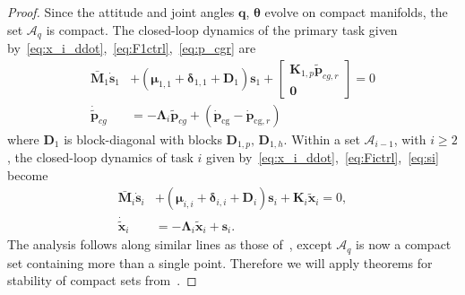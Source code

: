 \documentclass[../main.tex]{subfiles}
\begin{document}
\vspace{-7pt}
\begin{proof}
Since the attitude and joint angles $\bm{q}$, $\bm{\theta}$ evolve on compact manifolds, the set $\mathcal{A}_q$ is compact. The closed-loop dynamics of the primary task given by~\eqref{eq:x_i_ddot},~\eqref{eq:F1ctrl},~\eqref{eq:p_cgr} are
\vspace{-5pt}
\begin{subequations}\label{eq:y1_dyn}
    \begin{align}
        \bar{\bm{M}}_1 \dot{\bm{s}}_1 &+ \left( \bm{\mu}_{1,1} + \bm{\delta}_{1,1} + \bm{D}_1 \right) \bm{s}_1 + \left[ \begin{smallmatrix}
            \bm{K}_{1,p} \tilde{\bm{p}}_{cg,r} \\ \bm{0}
        \end{smallmatrix}\right] = 0\\
        \dot{\tilde{\bm{p}}}_{cg} &= - \bm{\Lambda}_i \tilde{\bm{p}}_{cg} + \left( \dot{\bm{p}}_{\textrm{cg}} - \dot{\bm{p}}_{\textrm{cg},r} \right)
    \end{align}
\end{subequations}
where $\bm{D}_1$ is block-diagonal with blocks $\bm{D}_{1,p},\, \bm{D}_{1,h}$. Within a set $\mathcal{A}_{i-1}$, with $i \geq 2$, the closed-loop dynamics of task $i$ given by~\eqref{eq:x_i_ddot},~\eqref{eq:Fictrl},~\eqref{eq:si} become
\begin{subequations}\label{eq:yi_dyn}
    \begin{align}
        \bar{\bm{M}}_i \dot{\bm{s}}_i &+ \left( \bm{\mu}_{i,i} + \bm{\delta}_{i,i} + \bm{D}_i \right) \bm{s}_i + \bm{K}_i \tilde{\bm{x}}_i = 0,\\
        \dot{\tilde{\bm{x}}}_i &= - \bm{\Lambda}_i \tilde{\bm{x}}_i + \bm{s}_i.
    \end{align}
\end{subequations}
%
The analysis follows along similar lines as those of~\cite{Dietrich2020,Saeboe2022}, except $\mathcal{A}_q$ is now a compact set containing more than a single point. Therefore we will apply theorems for stability of compact sets from~\cite{Maggiore2023}. 


\end{proof}
\end{document}
